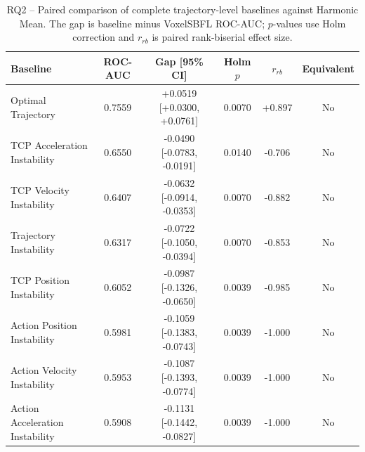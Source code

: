 \begin{table}[t]
\centering
\caption{RQ2 -- Paired comparison of complete trajectory-level baselines against Harmonic Mean. The gap is baseline minus VoxelSBFL ROC-AUC; $p$-values use Holm correction and $r_{rb}$ is paired rank-biserial effect size.}
\label{tab:rq2-baseline-statistics}
{\scriptsize
\setlength{\tabcolsep}{4pt}
\begin{tabular}{lccccc}
\toprule
Baseline & ROC-AUC & Gap [95\% CI] & Holm $p$ & $r_{rb}$ & Equivalent \\
\midrule
Optimal Trajectory & 0.7559 & +0.0519 [+0.0300, +0.0761] & 0.0070 & +0.897 & No \\
TCP Acceleration Instability & 0.6550 & -0.0490 [-0.0783, -0.0191] & 0.0140 & -0.706 & No \\
TCP Velocity Instability & 0.6407 & -0.0632 [-0.0914, -0.0353] & 0.0070 & -0.882 & No \\
Trajectory Instability & 0.6317 & -0.0722 [-0.1050, -0.0394] & 0.0070 & -0.853 & No \\
TCP Position Instability & 0.6052 & -0.0987 [-0.1326, -0.0650] & 0.0039 & -0.985 & No \\
Action Position Instability & 0.5981 & -0.1059 [-0.1383, -0.0743] & 0.0039 & -1.000 & No \\
Action Velocity Instability & 0.5953 & -0.1087 [-0.1393, -0.0774] & 0.0039 & -1.000 & No \\
Action Acceleration Instability & 0.5908 & -0.1131 [-0.1442, -0.0827] & 0.0039 & -1.000 & No \\
\bottomrule
\end{tabular}
}
\end{table}

